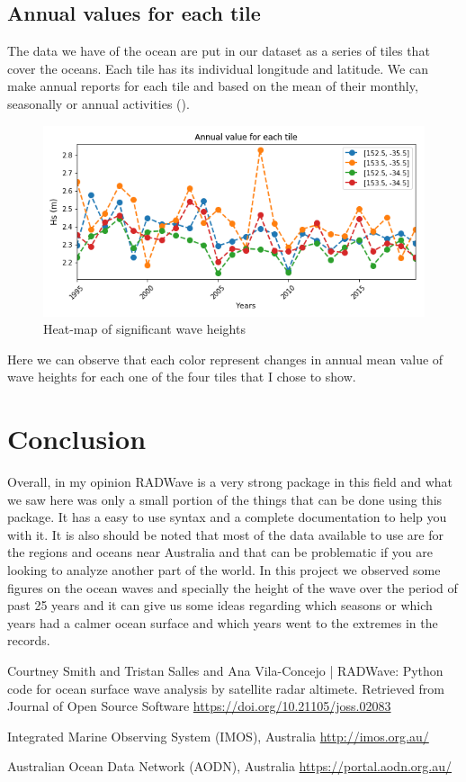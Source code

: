 \documentclass[12pt]{article}
\begin{document}
\newpage

\subsection{Annual values for each tile}
The data we have of the ocean are put in our dataset as a series of tiles that cover the oceans. Each tile has its individual longitude and latitude. We can make annual reports for each tile and based on the mean of their monthly, seasonally or annual activities (). 

\begin{figure}[h]
    \centering
    \includegraphics[width=12 cm]{annual_value.png}
    \caption{Heat-map of significant wave heights}
    \label{fig:fig7}
\end{figure}
 Here we can observe that each color represent changes in annual mean value of wave heights for each one of the four tiles that I chose to show.
 
\section{Conclusion}
Overall, in my opinion RADWave is a very strong package in this field and what we saw here was only a small portion of the  things that can be done using this package. It has a easy to use syntax and a complete documentation to help you with it. It is also should be noted that most of the data available to use are for the regions and oceans near Australia and that can be problematic if you are looking to analyze another part of the world. 
\newline In this project we observed some figures on the ocean waves and specially the height of the wave over the period of past 25 years and it can give us some ideas regarding which seasons or which years had a calmer ocean surface and which years went to the extremes in the records.
\newpage

\begin{thebibliography}{9}

    Courtney Smith and Tristan Salles and Ana Vila-Concejo | RADWave: Python code for ocean surface wave analysis by     satellite radar altimete. Retrieved from Journal of Open Source Software 
    {\url{https://doi.org/10.21105/joss.02083}}
   
	Integrated Marine Observing System (IMOS), Australia
	{\url{http://imos.org.au/}}
	

	Australian Ocean Data Network (AODN), Australia
	{\url{https://portal.aodn.org.au/}}


\end{thebibliography}
\end{document}
